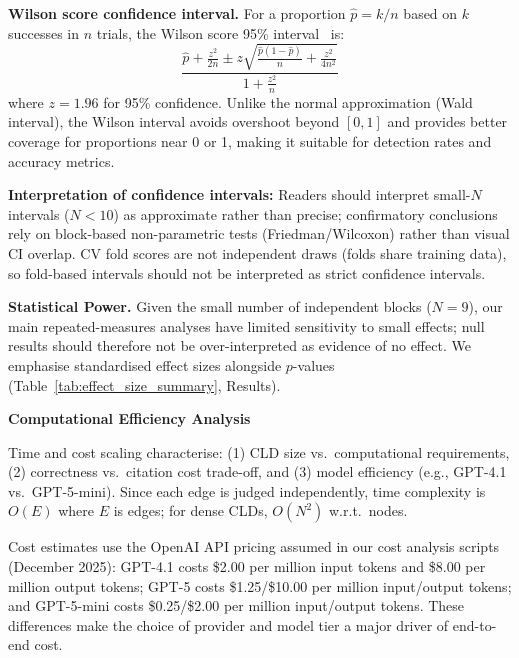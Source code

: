 \noindent\textbf{Wilson score confidence interval.} For a proportion $\hat{p} = k/n$ based on $k$ successes in $n$ trials, the Wilson score 95\% interval~\cite{wilson1927probable} is:
\begin{equation}
    \frac{\hat{p} + \frac{z^2}{2n} \pm z\sqrt{\frac{\hat{p}(1-\hat{p})}{n} + \frac{z^2}{4n^2}}}{1 + \frac{z^2}{n}}
\end{equation}
where $z = 1.96$ for 95\% confidence. Unlike the normal approximation (Wald interval), the Wilson interval avoids overshoot beyond $[0,1]$ and provides better coverage for proportions near 0 or 1, making it suitable for detection rates and accuracy metrics.

\textbf{Interpretation of confidence intervals:} Readers should interpret small-$N$ intervals ($N < 10$) as approximate rather than precise; confirmatory conclusions rely on block-based non-parametric tests (Friedman/Wilcoxon) rather than visual CI overlap. CV fold scores are not independent draws (folds share training data), so fold-based intervals should not be interpreted as strict confidence intervals.

\textbf{Statistical Power.} Given the small number of independent blocks ($N=9$), our main repeated-measures analyses have limited sensitivity to small effects; null results should therefore not be over-interpreted as evidence of no effect. We emphasise standardised effect sizes alongside $p$-values (Table~\ref{tab:effect_size_summary}, Results).

\noindent\textbf{Computational Efficiency Analysis}
\label{sec:computational_efficiency}

Time and cost scaling characterise: (1) CLD size vs.\ computational requirements, (2) correctness vs.\ citation cost trade-off, and (3) model efficiency (e.g., GPT-4.1 vs.\ GPT-5-mini). Since each edge is judged independently, time complexity is $O(E)$ where $E$ is edges; for dense CLDs, $O(N^2)$ w.r.t.\ nodes.

Cost estimates use the OpenAI API pricing assumed in our cost analysis scripts (December 2025): GPT-4.1 costs \$2.00 per million input tokens and \$8.00 per million output tokens; GPT-5 costs \$1.25/\$10.00 per million input/output tokens; and GPT-5-mini costs \$0.25/\$2.00 per million input/output tokens. These differences make the choice of provider and model tier a major driver of end-to-end cost.

